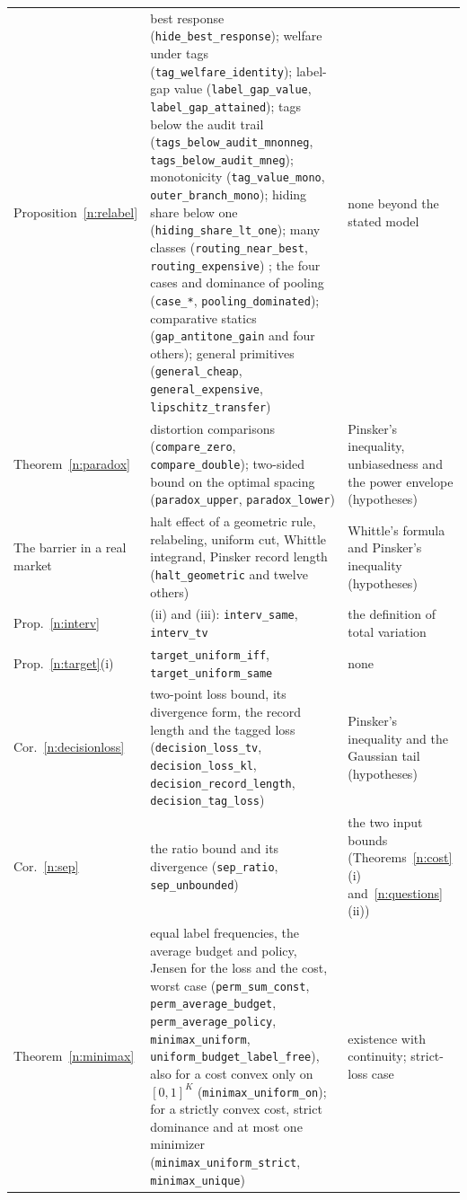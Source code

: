 \documentclass[12pt]{article}
\theoremstyle{definition}
\theoremstyle{remark}
\begin{document}
\begin{table}[ht]
\begin{tabular}{>{\raggedright\arraybackslash}p{}>{\raggedright\arraybackslash}p{}>{\raggedright\arraybackslash}p{}}
Proposition~\ref{n:relabel} & best response (\texttt{hide\_best\_response}); welfare under tags (\texttt{tag\_welfare\_identity}); label-gap value (\texttt{label\_gap\_value}, \texttt{label\_gap\_attained}); tags below the audit trail (\texttt{tags\_below\_audit\_mnonneg}, \texttt{tags\_below\_audit\_mneg}); monotonicity (\texttt{tag\_value\_mono}, \texttt{outer\_branch\_mono}); hiding share below one (\texttt{hiding\_share\_lt\_one}); many classes (\texttt{routing\_near\_best}, \texttt{routing\_expensive}) ; the four cases and dominance of pooling (\texttt{case\_*}, \texttt{pooling\_dominated}); comparative statics (\texttt{gap\_antitone\_gain} and four others); general primitives (\texttt{general\_cheap}, \texttt{general\_expensive}, \texttt{lipschitz\_transfer}) & none beyond the stated model\\
Theorem~\ref{n:paradox} & distortion comparisons (\texttt{compare\_zero}, \texttt{compare\_double}); two-sided bound on the optimal spacing (\texttt{paradox\_upper}, \texttt{paradox\_lower}) & Pinsker's inequality, unbiasedness and the power envelope (hypotheses)\\
The barrier in a real market & halt effect of a geometric rule, relabeling, uniform cut, Whittle integrand, Pinsker record length (\texttt{halt\_geometric} and twelve others) & Whittle's formula and Pinsker's inequality (hypotheses)\\
Prop.~\ref{n:interv} & (ii) and (iii): \texttt{interv\_same}, \texttt{interv\_tv} & the definition of total variation\\
Prop.~\ref{n:target}(i) & \texttt{target\_uniform\_iff}, \texttt{target\_uniform\_same} & none\\
Cor.~\ref{n:decisionloss} & two-point loss bound, its divergence form, the record length and the tagged loss (\texttt{decision\_loss\_tv}, \texttt{decision\_loss\_kl}, \texttt{decision\_record\_length}, \texttt{decision\_tag\_loss}) & Pinsker's inequality and the Gaussian tail (hypotheses)\\
Cor.~\ref{n:sep} & the ratio bound and its divergence (\texttt{sep\_ratio}, \texttt{sep\_unbounded}) & the two input bounds (Theorems~\ref{n:cost}(i) and~\ref{n:questions}(ii))\\
Theorem~\ref{n:minimax} & equal label frequencies, the average budget and policy, Jensen for the loss and the cost, worst case (\texttt{perm\_sum\_const}, \texttt{perm\_average\_budget}, \texttt{perm\_average\_policy}, \texttt{minimax\_uniform}, \nolinkurl{uniform_budget_label_free}), also for a cost convex only on $[0,1]^K$ (\nolinkurl{minimax_uniform_on}); for a strictly convex cost, strict dominance and at most one minimizer (\nolinkurl{minimax_uniform_strict}, \nolinkurl{minimax_unique}) & existence with continuity; strict-loss case\\

\end{tabular}
\end{table}
\end{document}
